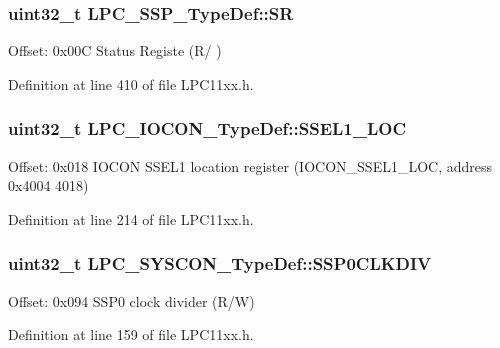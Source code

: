 \subsubsection[{\texorpdfstring{SR}{SR}}]{ uint32\+\_\+t L\+P\+C\+\_\+\+S\+S\+P\+\_\+\+Type\+Def\+::\+SR}\hypertarget{group___l_p_c11xx___definitions_ga82edd1e82e00dbdc9db58e5173893d77}{}\label{group___l_p_c11xx___definitions_ga82edd1e82e00dbdc9db58e5173893d77}
Offset\+: 0x00C Status Registe (R/ ) 

Definition at line 410 of file L\+P\+C11xx.\+h.

\subsubsection[{\texorpdfstring{S\+S\+E\+L1\+\_\+\+L\+OC}{SSEL1_LOC}}]{ uint32\+\_\+t L\+P\+C\+\_\+\+I\+O\+C\+O\+N\+\_\+\+Type\+Def\+::\+S\+S\+E\+L1\+\_\+\+L\+OC}\hypertarget{group___l_p_c11xx___definitions_gade4b6c37c371658c818344930384b993}{}\label{group___l_p_c11xx___definitions_gade4b6c37c371658c818344930384b993}
Offset\+: 0x018 I\+O\+C\+ON S\+S\+E\+L1 location register (I\+O\+C\+O\+N\+\_\+\+S\+S\+E\+L1\+\_\+\+L\+OC, address 0x4004 4018) 

Definition at line 214 of file L\+P\+C11xx.\+h.

\subsubsection[{\texorpdfstring{S\+S\+P0\+C\+L\+K\+D\+IV}{SSP0CLKDIV}}]{ uint32\+\_\+t L\+P\+C\+\_\+\+S\+Y\+S\+C\+O\+N\+\_\+\+Type\+Def\+::\+S\+S\+P0\+C\+L\+K\+D\+IV}\hypertarget{group___l_p_c11xx___definitions_gac12014d9def35fe72f78e96d151bcd2e}{}\label{group___l_p_c11xx___definitions_gac12014d9def35fe72f78e96d151bcd2e}
Offset\+: 0x094 S\+S\+P0 clock divider (R/W) 

Definition at line 159 of file L\+P\+C11xx.\+h.

